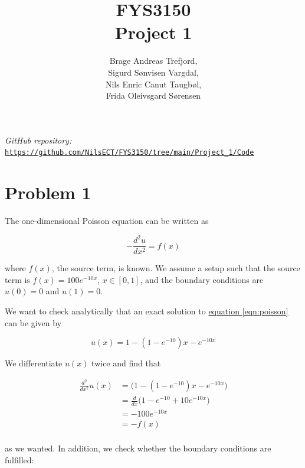 \documentclass[english,notitlepage]{article}  %
\begin{document}
\title{FYS3150\\Project 1}
\author{Brage Andreas Trefjord,\\Sigurd Sønvisen Vargdal,\\Nils Enric Canut Taugbøl,\\Frida Oleivsgard Sørensen}
\maketitle

\textit{GitHub repository:} \texttt{\url{https://github.com/NilsECT/FYS3150/tree/main/Project_1/Code}}

\section*{Problem 1}

  The one-dimensional Poisson equation can be written as

  \begin{equation}
    -\frac{d^2 u}{dx^2} = f(x) \label{eqn:poisson}
  \end{equation}

  where $f(x)$, the source term, is known. We assume a setup such that the source term is $f(x) = 100e^{-10x}$, $x \in [0, 1]$, and the boundary conditions are $u(0) = 0$ and $u(1)=0$.


  We want to check analytically that an exact solution to \hyperref[eqn:poisson]{equation \ref*{eqn:poisson}} can be given by

  \begin{equation}
    u(x) = 1 - (1-e^{-10})x - e^{-10x} \label{eqn:u(x)}
  \end{equation}

  We differentiate $u(x)$ twice and find that

  \begin{equation}
    \begin{split}
      \frac{d^2}{dx^2} u(x) &= \bigg( 1 - (1-e^{-10} ) x - e^{-10x} \bigg) \\
      &=  \frac{d}{dx} \bigg( 1-e^{-10} + 10 e^{-10x} \bigg) \\
      &=  - 100 e^{-10x} \\
      &= -f(x) \\
    \end{split}
  \end{equation}

  as we wanted. In addition, we check whether the boundary conditions are fulfilled:
\end{document}
